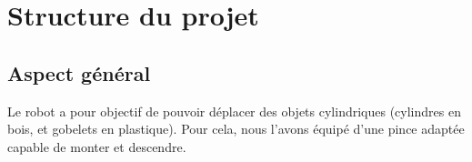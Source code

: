 \part{Structure du projet}
\chapter{Aspect général}
Le robot a pour objectif de pouvoir déplacer des objets cylindriques (cylindres en bois, et gobelets en plastique). Pour cela, nous l'avons équipé d'une pince adaptée capable de monter et descendre.


\begin{figure}[h]
	\centering

	\begin{floatrow}
    \end{floatrow}
\end{figure}


